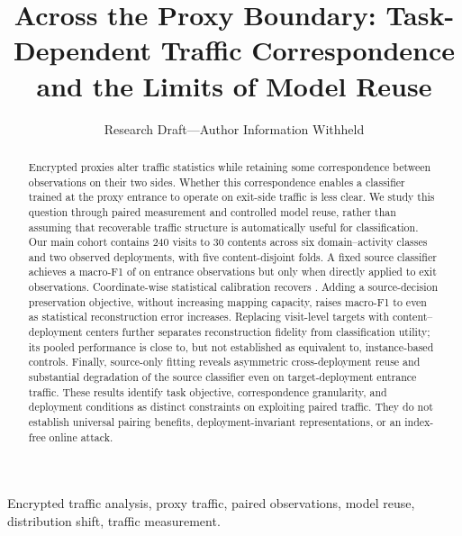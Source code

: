 \documentclass[journal]{IEEEtran}
\title{Across the Proxy Boundary: Task-Dependent Traffic Correspondence and the Limits of Model Reuse}
\author{Research Draft---Author Information Withheld}
\begin{document}
\raggedbottom
\maketitle
\begin{abstract}
Encrypted proxies alter traffic statistics while retaining some correspondence between observations on their two sides. Whether this correspondence enables a classifier trained at the proxy entrance to operate on exit-side traffic is less clear. We study this question through paired measurement and controlled model reuse, rather than assuming that recoverable traffic structure is automatically useful for classification. Our main cohort contains 240 visits to 30 contents across six domain--activity classes and two observed deployments, with five content-disjoint folds. A fixed source classifier achieves a macro-F1 of \FOneA{} on entrance observations but only \FOneB{} when directly applied to exit observations. Coordinate-wise statistical calibration recovers \FOneC{}. Adding a source-decision preservation objective, without increasing mapping capacity, raises macro-F1 to \FOneF{} even as statistical reconstruction error increases. Replacing visit-level targets with content--deployment centers further separates reconstruction fidelity from classification utility; its pooled performance is close to, but not established as equivalent to, instance-based controls. Finally, source-only fitting reveals asymmetric cross-deployment reuse and substantial degradation of the source classifier even on target-deployment entrance traffic. These results identify task objective, correspondence granularity, and deployment conditions as distinct constraints on exploiting paired traffic. They do not establish universal pairing benefits, deployment-invariant representations, or an index-free online attack.
\end{abstract}
\begin{IEEEkeywords}
Encrypted traffic analysis, proxy traffic, paired observations, model reuse, distribution shift, traffic measurement.
\end{IEEEkeywords}








\end{document}
